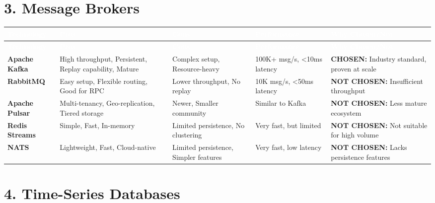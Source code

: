 \documentclass[12pt,a4paper,landscape]{article}
\begin{document}
\section*{3. Message Brokers}

\begin{longtable}{|p{2.5cm}|p{3cm}|p{3cm}|p{3cm}|p{4cm}|}
\hline
\rowcolor{headercolor}
\textcolor{white}{\textbf{Technology}} & 
\textcolor{white}{\textbf{Pros}} & 
\textcolor{white}{\textbf{Cons}} & 
\textcolor{white}{\textbf{Performance}} & 
\textcolor{white}{\textbf{Why Chosen/Not}} \\
\hline
\endfirsthead

\hline
\rowcolor{headercolor}
\textcolor{white}{\textbf{Technology}} & 
\textcolor{white}{\textbf{Pros}} & 
\textcolor{white}{\textbf{Cons}} & 
\textcolor{white}{\textbf{Performance}} & 
\textcolor{white}{\textbf{Why Chosen/Not}} \\
\hline
\endhead

\rowcolor{rowcolor1}
\textbf{Apache Kafka} & 
High throughput, Persistent, Replay capability, Mature & 
Complex setup, Resource-heavy & 
100K+ msg/s, <10ms latency & 
\textbf{CHOSEN:} Industry standard, proven at scale \\
\hline

\rowcolor{rowcolor2}
\textbf{RabbitMQ} & 
Easy setup, Flexible routing, Good for RPC & 
Lower throughput, No replay & 
10K msg/s, <50ms latency & 
\textbf{NOT CHOSEN:} Insufficient throughput \\
\hline

\rowcolor{rowcolor1}
\textbf{Apache Pulsar} & 
Multi-tenancy, Geo-replication, Tiered storage & 
Newer, Smaller community & 
Similar to Kafka & 
\textbf{NOT CHOSEN:} Less mature ecosystem \\
\hline

\rowcolor{rowcolor2}
\textbf{Redis Streams} & 
Simple, Fast, In-memory & 
Limited persistence, No clustering & 
Very fast, but limited & 
\textbf{NOT CHOSEN:} Not suitable for high volume \\
\hline

\rowcolor{rowcolor1}
\textbf{NATS} & 
Lightweight, Fast, Cloud-native & 
Limited persistence, Simpler features & 
Very fast, low latency & 
\textbf{NOT CHOSEN:} Lacks persistence features \\
\hline
\end{longtable}

\newpage

\section*{4. Time-Series Databases}
\end{document}

